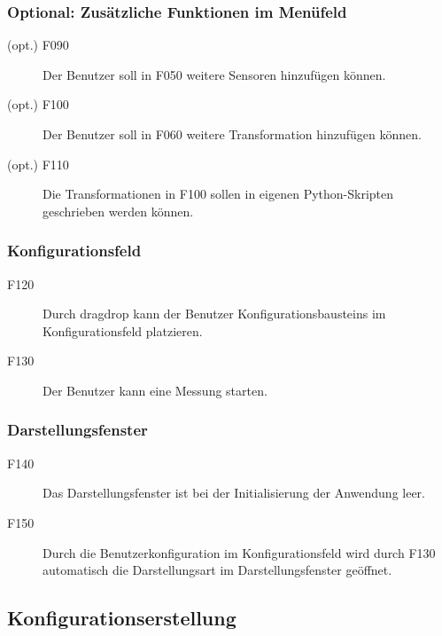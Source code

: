 \documentclass[parskip=full]{scrartcl}
\begin{document}
\subsubsection{Optional: Zusätzliche Funktionen im Menüfeld}

\begin{description}
\item[(opt.) F090] Der Benutzer soll in F050 weitere Sensoren hinzufügen können.
\item[(opt.) F100] Der Benutzer soll in F060 weitere Transformation hinzufügen können.
\item[(opt.) F110] Die Transformationen in F100 sollen in eigenen Python-Skripten geschrieben werden können.
\end{description}

\subsubsection{Konfigurationsfeld}

\begin{description}
\item[F120] Durch \gls{dragdrop} kann der Benutzer \glspl{Konfigurationsbaustein} im Konfigurationsfeld platzieren.
\item[F130] Der Benutzer kann eine Messung starten.
\end{description}


\subsubsection{Darstellungsfenster}

\begin{description}
\item[F140] Das Darstellungsfenster ist bei der Initialisierung der Anwendung leer.
\item[F150] Durch die \gls{Benutzerkonfiguration} im Konfigurationsfeld wird durch F130 automatisch die Darstellungsart im Darstellungsfenster geöffnet.
\end{description}



\subsection{Konfigurationserstellung}
\end{document}

